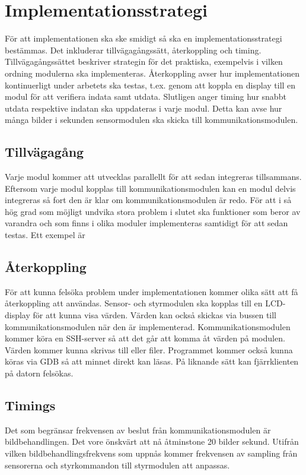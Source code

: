 \documentclass[designspec/spec.tex]{subfiles}
\begin{document}
\section{Implementationsstrategi}

För att implementationen ska ske smidigt så ska en implementationsstrategi
bestämmas. Det inkluderar tillvägagångssätt, återkoppling och timing.
Tillvägagångssättet beskriver strategin för det praktiska, exempelvis i vilken
ordning modulerna ska implementeras. Återkoppling avser hur implementationen
kontinuerligt under arbetets ska testas, t.ex. genom att koppla en display till
en modul för att verifiera indata samt utdata.
Slutligen anger timing hur snabbt utdata respektive indatan ska
uppdateras i varje modul. Detta kan avse hur många bilder i sekunden
sensormodulen ska skicka till kommunikationsmodulen. 

\subsection{Tillvägagång}
Varje modul kommer att utvecklas parallellt för att sedan integreras
tillsammans. Eftersom varje modul kopplas till kommunikationsmodulen kan en
modul delvis integreras så fort den är klar om kommunikationsmodulen är
redo. För att i så hög grad som möjligt undvika stora problem i slutet ska
funktioner som beror av varandra och som finns i olika moduler implementeras
samtidigt för att sedan testas. Ett exempel är 

\subsection{Återkoppling}
För att kunna felsöka problem under implementationen kommer olika sätt att få
återkoppling att användas. Sensor- och styrmodulen ska kopplas till en
LCD-display för att kunna visa värden. Värden kan också skickas via bussen till
kommunikationsmodulen när den är implementerad. Kommunikationsmodulen kommer
köra en SSH-server så att det går att komma åt värden på modulen. Värden kommer
kunna skrivas till  eller filer. Programmet kommer också kunna
köras via GDB så att minnet direkt kan läsas. På liknande sätt kan
fjärrklienten på datorn felsökas.

\subsection{Timings}
Det som begränsar frekvensen av beslut från kommunikationsmodulen är
bildbehandlingen. Det vore önskvärt att nå åtminstone 20 bilder sekund. Utifrån
vilken bildbehandlingsfrekvens som uppnås kommer frekvensen av sampling från
sensorerna och styrkommandon till styrmodulen att anpassas. 
\end{document}
